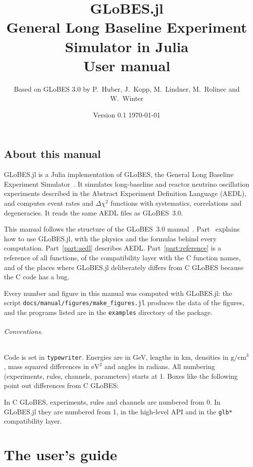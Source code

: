 \documentclass[11pt,a4paper,openany]{book}
\title{\Huge\bfseries GLoBES.jl\\[6pt]
  \LARGE General Long Baseline Experiment Simulator in Julia\\[18pt]
  \Large User manual}
\author{Based on GLoBES 3.0 by P.~Huber, J.~Kopp, M.~Lindner, M.~Rolinec and W.~Winter}
\date{Version 0.1 \quad\textbullet\quad \today}
\newcommand{\code}[1]{\texttt{#1}}
\newcommand{\file}[1]{\texttt{#1}}
\begin{document}
\frontmatter
\maketitle

\chapter*{About this manual}

GLoBES.jl is a Julia implementation of GLoBES, the General Long Baseline
Experiment Simulator~\cite{Huber:2004ka,Huber:2007ji}. It simulates long-baseline
and reactor neutrino oscillation experiments described in the Abstract Experiment
Definition Language (AEDL), and computes event rates and $\Delta\chi^2$ functions
with systematics, correlations and degeneracies. It reads the same AEDL files as
GLoBES~3.0.

This manual follows the structure of the GLoBES~3.0 manual~\cite{GLoBESmanual}.
Part~\ref{part:user} explains how to use GLoBES.jl, with the physics and the
formulas behind every computation. Part~\ref{part:aedl} describes AEDL.
Part~\ref{part:reference} is a reference of all functions, of the compatibility
layer with the C function names, and of the places where GLoBES.jl deliberately
differs from C GLoBES because the C code has a bug.

Every number and figure in this manual was computed with GLoBES.jl: the script
\file{docs/manual/figures/make\_figures.jl} produces the data of the figures, and
the programs listed are in the \file{examples} directory of the package.

\paragraph{Conventions.} Code is set in \code{typewriter}. Energies are in GeV,
lengths in km, densities in $\mathrm{g/cm^3}$, mass squared differences in
$\mathrm{eV}^2$ and angles in radians. All numbering (experiments, rules,
channels, parameters) starts at 1. Boxes like the following point out
differences from C GLoBES:
\begin{cdiff}
In C GLoBES, experiments, rules and channels are numbered from 0. In GLoBES.jl
they are numbered from 1, in the high-level API and in the \code{glb*}
compatibility layer.
\end{cdiff}

\tableofcontents

\mainmatter
\part{The user's guide}\label{part:user}









\end{document}
